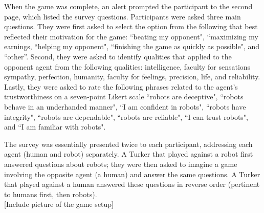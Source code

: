 \documentclass{sig-alternate}
\begin{document}
When the game was complete, an alert prompted the participant to the second page, which listed the survey questions. Participants were asked three main questions. They were first asked to select the option from the following that best reflected their motivation for the game: ``beating my opponent", ``maximizing my earnings, ``helping my opponent", ``finishing the game as quickly as possible", and ``other''. Second, they were asked to identify qualities that applied to the opponent agent \cite{arras2000we} from the following qualities: intelligence, faculty for sensations sympathy, perfection, humanity, faculty for feelings, precision, life, and reliability. Lastly, they were asked to rate the following phrases related to the agent's trustworthiness on a seven-point Likert scale \cite{jian2000foundations} ``robots are deceptive", ``robots behave in an underhanded manner", ``I am confident in robots", ``robots have integrity", ``robots are dependable", ``robots are reliable", ``I can trust robots", and ``I am familiar with robots".

The survey was essentially presented twice to each participant, addressing each agent (human and robot) separately. A Turker that played against a robot first answered questions about robots; they were then asked to imagine a game involving the opposite agent (a human) and answer the same questions. A Turker that played against a human answered these questions in reverse order (pertinent to humans first, then robots). \\

[Include picture of the game setup]\\


\end{document}
